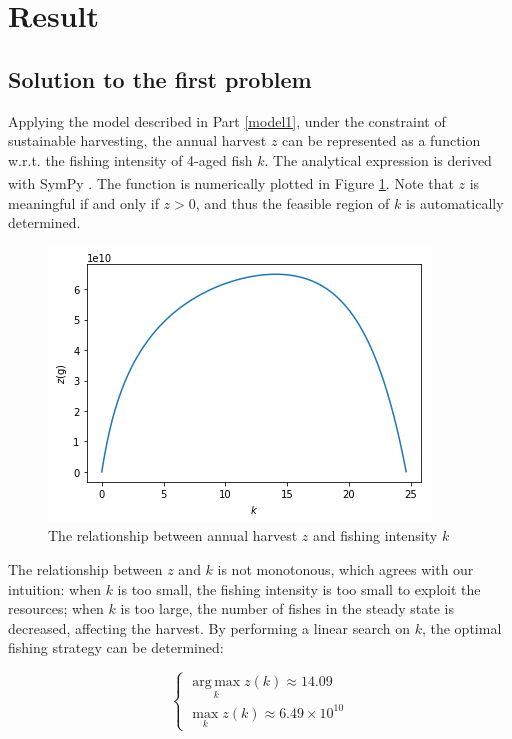 \documentclass{IEEEtran}
\DeclareMathOperator*{\argmax}{arg\,max}
\begin{document}
\section{Result}

\subsection{Solution to the first problem}\label{result1}

Applying the model described in Part \ref{model1}, under the constraint of sustainable harvesting, the annual harvest $z$ can be represented as a function w.r.t. the fishing intensity of 4-aged fish $k$. The analytical expression is derived with SymPy \textsuperscript{\cite{Joyner:2012:OSC:2110170.2110185}}. The function is numerically plotted in Figure \ref{plot1}. Note that $z$ is meaningful if and only if $z>0$, and thus the feasible region of $k$ is automatically determined.

\begin{figure}[h]
	\centering
	\includegraphics[width=\columnwidth]{plot1}
	\caption{The relationship between annual harvest $z$ and fishing intensity $k$\label{plot1}}
\end{figure}

The relationship between $z$ and $k$ is not monotonous, which agrees with our intuition: when $k$ is too small, the fishing intensity is too small to exploit the resources; when $k$ is too large, the number of fishes in the steady state is decreased, affecting the harvest. By performing a linear search on $k$, the optimal fishing strategy can be determined:

$$\begin{cases}\argmax\limits_k z(k) \approx 14.09\\\max\limits_k z(k) \approx 6.49\times 10^{10} \end{cases}$$
\end{document}
